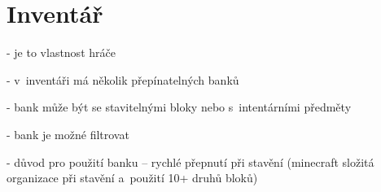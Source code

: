 
\section{Inventář}

- je to vlastnost hráče

- v~inventáři má několik přepínatelných banků

- bank může být se stavitelnými bloky nebo s~intentárními předměty

- bank je možné filtrovat

- důvod pro použití banku -- rychlé přepnutí při stavění (minecraft složitá organizace při stavění a~použití 10+ druhů bloků)